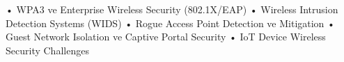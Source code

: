 • WPA3 ve Enterprise Wireless Security (802.1X/EAP)
• Wireless Intrusion Detection Systems (WIDS)
• Rogue Access Point Detection ve Mitigation
• Guest Network Isolation ve Captive Portal Security
• IoT Device Wireless Security Challenges